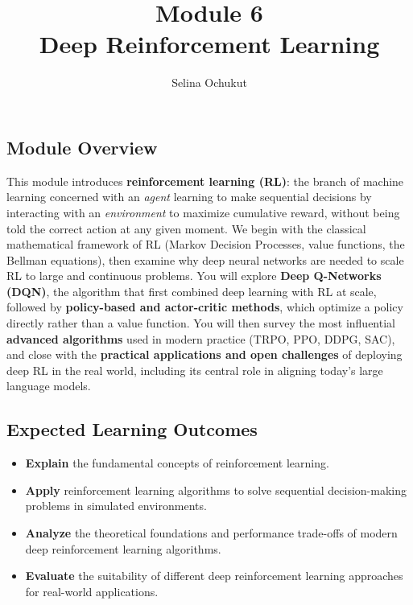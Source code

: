 \documentclass[12pt,a4paper]{article}
\title{\color{moduleblue}\Huge \textbf{Module 6}\\[0.3em]
\Large Deep Reinforcement Learning}
\author{Selina Ochukut}
\date{}
\begin{document}
\maketitle

\begin{tcolorbox}[colback=moduleblue!6, colframe=moduleblue, arc=2mm, boxrule=1pt]
\subsection*{Module Overview} 
This module introduces \textbf{reinforcement learning (RL)}: the branch of machine learning concerned with an \emph{agent} learning to make sequential decisions by interacting with an \emph{environment} to maximize cumulative reward, without being told the correct action at any given moment. We begin with the classical mathematical framework of RL (Markov Decision Processes, value functions, the Bellman equations), then examine why deep neural networks are needed to scale RL to large and continuous problems. You will explore \textbf{Deep Q-Networks (DQN)}, the algorithm that first combined deep learning with RL at scale, followed by \textbf{policy-based and actor-critic methods}, which optimize a policy directly rather than a value function. You will then survey the most influential \textbf{advanced algorithms} used in modern practice (TRPO, PPO, DDPG, SAC), and close with the \textbf{practical applications and open challenges} of deploying deep RL in the real world, including its central role in aligning today's large language models. 
\end{tcolorbox}

\subsection*{Expected Learning Outcomes}
\begin{itemize}
    \item \textbf{Explain} the fundamental concepts of reinforcement learning.
    \item \textbf{Apply} reinforcement learning algorithms to solve sequential decision-making problems in simulated environments.
    \item \textbf{Analyze} the theoretical foundations and performance trade-offs of modern deep reinforcement learning algorithms.
    \item \textbf{Evaluate} the suitability of different deep reinforcement learning approaches for real-world applications.
\end{itemize}
\end{document}
